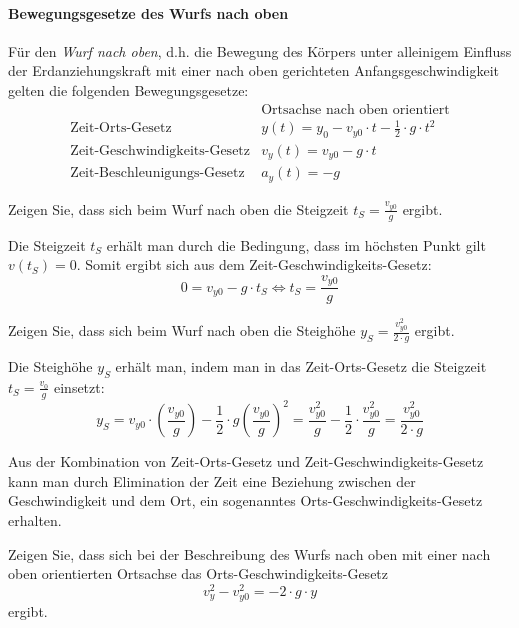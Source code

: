 \paragraph{Bewegungsgesetze des Wurfs nach oben}
Für den \textit{Wurf nach oben}, d.h. die Bewegung des Körpers unter alleinigem Einfluss der Erdanziehungskraft mit einer nach oben gerichteten Anfangsgeschwindigkeit gelten die folgenden Bewegungsgesetze:
\begin{eqnarray*}
    & \text{Ortsachse nach oben orientiert}  \\
    \text{Zeit-Orts-Gesetz} & y(t) = y_{0} - v_{y0} \cdot t - \frac{1}{2} \cdot g \cdot t^{2} \\
    \text{Zeit-Geschwindigkeits-Gesetz} & v_{y}(t) = v_{y0} -g \cdot t  \\
    \text{Zeit-Beschleunigungs-Gesetz} & a_{y}(t) = -g 
\end{eqnarray*}

\begin{example}
Zeigen Sie, dass sich beim Wurf nach oben die Steigzeit $t_{S} = \frac{v_{y0}}{g}$ ergibt.
\end{example}

\begin{solution}
Die Steigzeit $t_{S}$ erhält man durch die Bedingung, dass im höchsten Punkt gilt $v(t_{S})=0$. Somit ergibt sich aus dem Zeit-Geschwindigkeits-Gesetz:
\[ 0= v_{y0} - g \cdot t_{S} \Leftrightarrow t_{S} =  \frac{v_{y0}}{g} \]
\end{solution}

\begin{example}
Zeigen Sie, dass sich beim Wurf nach oben die Steighöhe $y_{S} = \frac{v_{y0}^{2}}{2 \cdot g}$ ergibt.
\end{example}

\begin{solution}
Die Steighöhe $y_{S}$ erhält man, indem man in das Zeit-Orts-Gesetz die Steigzeit $t_{S} = \frac{v_{0}}{g}$ einsetzt:
\[ y_{S} = v_{y0} \cdot \left( \frac{v_{y0}}{g} \right) - \frac{1}{2} \cdot g \left( \frac{v_{y0}}{g} \right)^{2} = \frac{v_{y0}^{2}}{g} - \frac{1}{2} \cdot \frac{v_{y0}^{2}}{g} = \frac{v_{y0}^{2}}{2 \cdot g} \]
\end{solution}

\begin{example}
Aus der Kombination von Zeit-Orts-Gesetz und Zeit-Geschwindigkeits-Gesetz kann man durch Elimination der Zeit eine Beziehung zwischen der Geschwindigkeit und dem Ort, ein sogenanntes Orts-Geschwindigkeits-Gesetz erhalten.

Zeigen Sie, dass sich bei der Beschreibung des Wurfs nach oben mit einer nach oben orientierten Ortsachse das Orts-Geschwindigkeits-Gesetz
\[ v_{y}^{2} - v_{y0}^{2} = -2 \cdot g \cdot y \]
ergibt.
\end{example}


